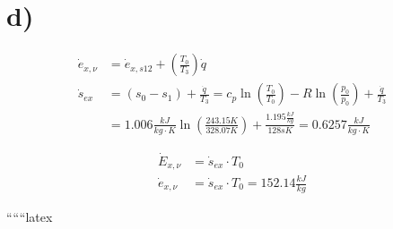 

\section*{d)}

\begin{align*}
\dot{e}_{x, \nu} &= \dot{e}_{x, s12} + \left( \frac{T_0}{T_3} \right) \dot{q} \\
\dot{s}_{ex} &= (s_0 - s_1) + \frac{\dot{q}}{T_3} = c_p \ln \left( \frac{T_0}{T_0} \right) - R \ln \left( \frac{p_0}{p_0} \right) + \frac{\dot{q}}{T_3} \\
&= 1.006 \frac{kJ}{kg \cdot K} \ln \left( \frac{243.15 K}{328.07 K} \right) + \frac{1.195 \frac{kJ}{kg}}{128 sK} = 0.6257 \frac{kJ}{kg \cdot K}
\end{align*}

\begin{align*}
\dot{E}_{x, \nu} &= \dot{s}_{ex} \cdot T_0 \\
\dot{e}_{x, \nu} &= \dot{s}_{ex} \cdot T_0 = 152.14 \frac{kJ}{kg}
\end{align*}

``````latex
